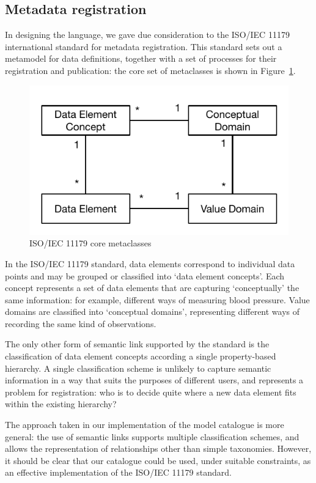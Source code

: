 \subsection{Metadata registration}

In designing the language, we gave due consideration to the ISO/IEC
11179 international standard for metadata registration.  This standard
sets out a metamodel for data definitions, together with a set of
processes for their registration and publication: the core set of
metaclasses is shown in Figure~\ref{fig:11179}. 

\begin{figure}[h]
  \centering
  \includegraphics[width=0.75\columnwidth]{ASEFigs/11179metamodel}
  \caption{ISO/IEC 11179 core metaclasses} 
  \label{fig:11179}
\end{figure}

In the ISO/IEC 11179 standard, data elements correspond to individual
data points and may be grouped or classified into `data element
concepts'.  Each concept represents a set of data elements that are
capturing `conceptually' the same information: for example, different
ways of measuring blood pressure.  Value domains are classified into
`conceptual domains', representing different ways of recording the
same kind of observations. 

The only other form of semantic link supported by the standard is the
classification of data element concepts according a single
property-based hierarchy.  A single classification scheme is unlikely
to capture semantic information in a way that suits the purposes of
different users, and represents a problem for registration: who is to
decide quite where a new data element fits within the existing
hierarchy?  

The approach taken in our implementation of the model catalogue is
more general: the use of semantic links supports multiple
classification schemes, and allows the representation of relationships
other than simple taxonomies.  However, it should be clear that our
catalogue could be used, under suitable constraints, as an effective
implementation of the ISO/IEC 11179 standard. 

